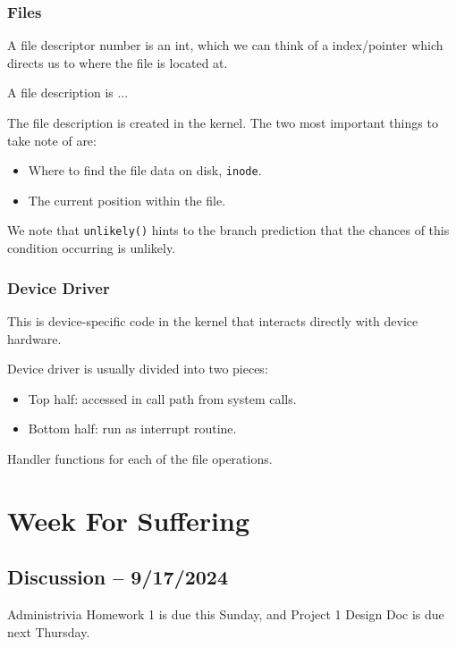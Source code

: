 \documentclass[openany]{book}
\begin{document}
\subsection{Files}
\begin{defn}
	A file descriptor number is an int, which we can think of a index/pointer which directs us to where the file is located at.
\end{defn}

\begin{defn}
	A file description is ...
\end{defn}
The file description is created in the kernel. The two most important things to take note of are:
\begin{itemize}
	\item Where to find the file data on disk, \texttt{inode}.
	\item The current position within the file.
\end{itemize}

\begin{rmk}
	We note that \texttt{unlikely()} hints to the branch prediction that the chances of this condition occurring is unlikely.
\end{rmk}

\subsection{Device Driver}
\begin{defn}
	This is device-specific code in the kernel that interacts directly with device hardware.
\end{defn}

Device driver is usually divided into two pieces:
\begin{itemize}
	\item Top half: accessed in call path from system calls.
	\item Bottom half: run as interrupt routine.
\end{itemize}

Handler functions for each of the file operations.

\chapter{Week For Suffering}
\section{Discussion -- 9/17/2024}
\begin{miscbox}{Administrivia}
	Homework 1 is due this Sunday, and Project 1 Design Doc is due next Thursday.
\end{miscbox}
\end{document}
